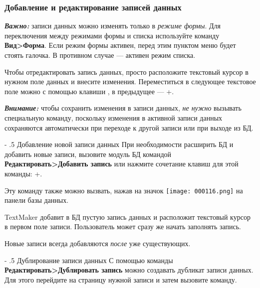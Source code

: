 ﻿\documentclass[a4paper,10pt]{article}
\makeatletter
\renewcommand\paragraph{%
   \@startsection{paragraph}{4}{0mm}%
      {-\baselineskip}%
      {.5\baselineskip}%
      {\normalfont\normalsize\bfseries}}
\makeatother
\begin{document}
\subsubsection{Добавление и редактирование записей данных}
\begin{mdframed}[backgroundcolor=blue!10]
\textbf{\textit{Важно:}} записи данных можно изменять только в \textit{режиме формы}. Для переключения между режимами формы и списка используйте команду \textbf{Вид>Форма}. Если режим формы активен, перед этим пунктом меню будет стоять галочка. В противном случае — активен режим списка.
\end{mdframed}

Чтобы отредактировать запись данных, просто расположите текстовый курсор в нужном поле данных и внесите изменения. Переместиться в следующее текстовое поле можно с помощью клавиши , в предыдущее — +.

\begin{mdframed}[backgroundcolor=blue!10]
\textbf{\textit{Внимание:}} чтобы сохранить изменения в записи данных, \textit{не нужно} вызывать специальную команду, поскольку изменения в активной записи данных сохраняются автоматически при переходе к другой записи или при выходе из БД.
\end{mdframed}

\paragraph{Добавление новой записи данных}
При необходимости расширить БД и добавить новые записи, вызовите модуль БД командой \textbf{Редактировать>Добавить запись} или нажмите сочетание клавиш для этой команды: +.

Эту команду также можно вызвать, нажав на значок \texttt{[image: 000116.png]} на панели базы данных.

TextMaker добавит в БД пустую запись данных и расположит текстовый курсор в первом поле записи. Пользователь может сразу же начать заполнять запись.

Новые записи всегда добавляются \textit{после} уже существующих.

\paragraph{Дублирование записи данных}
С помощью команды \textbf{Редактировать>Дублировать запись} можно создавать дубликат записи данных. Для этого перейдите на страницу нужной записи и затем вызовите команду.
\end{document}
